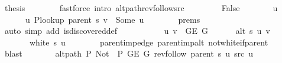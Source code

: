 \begin{isabellebody}
\ {\isacharquery}{\kern0pt}thesis\isanewline
\ \ \ \ \ \ \isamarkupfalse%
\ {\isacharparenleft}{\kern0pt}fastforce\ intro{\isacharcolon}{\kern0pt}\ alt{\isacharunderscore}{\kern0pt}path{\isacharunderscore}{\kern0pt}rev{\isacharunderscore}{\kern0pt}follow{\isacharunderscore}{\kern0pt}src{\isacharparenright}{\kern0pt}\isanewline
\ \ \isamarkupfalse%
\isanewline
\ \ \ \ \isamarkupfalse%
\ False\isanewline
\ \ \ \ \isamarkupfalse%
\ \isamarkupfalse%
\ u\ \isanewline
\ \ \ \ \ \ u{\isacharcolon}{\kern0pt}\ {\isachardoublequoteopen}P{\isacharunderscore}{\kern0pt}lookup\ {\isacharparenleft}{\kern0pt}parent\ s{\isacharparenright}{\kern0pt}\ v\ {\isacharequal}{\kern0pt}\ Some\ u{\isachardoublequoteclose}\isanewline
\ \ \ \ \ \ \isamarkupfalse%
\ {\isachardoublequoteopen}{}{\isachardot}{\kern0pt}prems{\isachardoublequoteclose}\isanewline
\ \ \ \ \ \ \isamarkupfalse%
\ {\isacharparenleft}{\kern0pt}auto\ simp\ add{\isacharcolon}{\kern0pt}\ is{\isacharunderscore}{\kern0pt}discovered{\isacharunderscore}{\kern0pt}def{\isacharparenright}{\kern0pt}\isanewline
\ \ \ \ \isamarkupfalse%
\isanewline
\ \ \ \ \ \ {\isachardoublequoteopen}{\isacharbraceleft}{\kern0pt}u{\isacharcomma}{\kern0pt}\ v{\isacharbraceright}{\kern0pt}\ {\isasymin}\ G{\isachardot}{\kern0pt}E\ G{\isachardoublequoteclose}\isanewline
\ \ \ \ \ \ {\isachardoublequoteopen}alt\ s\ u\ v{\isachardoublequoteclose}\isanewline
\ \ \ \ \ \ {\isachardoublequoteopen}{\isasymnot}\ white\ s\ u{\isachardoublequoteclose}\isanewline
\ \ \ \ \ \ \isamarkupfalse%
\ parent{\isacharunderscore}{\kern0pt}imp{\isacharunderscore}{\kern0pt}edge\ parent{\isacharunderscore}{\kern0pt}imp{\isacharunderscore}{\kern0pt}alt\ not{\isacharunderscore}{\kern0pt}white{\isacharunderscore}{\kern0pt}if{\isacharunderscore}{\kern0pt}parent\isanewline
\ \ \ \ \ \ \isamarkupfalse%
\ blast{\isacharplus}{\kern0pt}\isanewline
\ \ \ \ \isamarkupfalse%
\ \isamarkupfalse%
\ {\isachardoublequoteopen}alt{\isacharunderscore}{\kern0pt}path\ P{\isacharprime}{\kern0pt}{\isacharprime}{\kern0pt}\ {\isacharparenleft}{\kern0pt}Not\ {\isasymcirc}\ P{\isacharprime}{\kern0pt}{\isacharprime}{\kern0pt}{\isacharparenright}{\kern0pt}\ {\isacharparenleft}{\kern0pt}G{\isachardot}{\kern0pt}E\ G{\isacharparenright}{\kern0pt}\ {\isacharparenleft}{\kern0pt}rev{\isacharunderscore}{\kern0pt}follow\ {\isacharparenleft}{\kern0pt}parent\ s{\isacharparenright}{\kern0pt}\ u{\isacharparenright}{\kern0pt}\ src\ u{\isachardoublequoteclose}\isanewline

\end{isabellebody}
